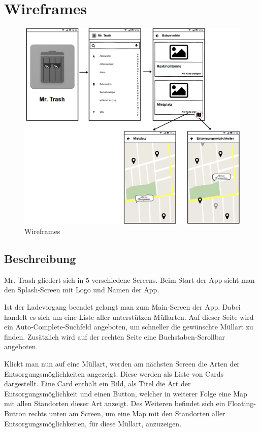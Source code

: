 \documentclass[12pt, a4paper]{scrreprt}
\begin{document}
\section{Wireframes}
\begin{figure}[h]
\centering
\includegraphics[width=13cm]{../graphical/mockup/wireframes.png}
\caption{\label{fig:art1} Wireframes}
\end{figure}

\subsection{Beschreibung}
Mr. Trash gliedert sich in 5 verschiedene Screens. Beim Start der App sieht man den Splash-Screen mit Logo und Namen der App.

Ist der Ladevorgang beendet gelangt man zum Main-Screen der App. Dabei handelt es sich um eine Liste aller unterstützen Müllarten. Auf dieser Seite wird ein Auto-Complete-Suchfeld angeboten, um schneller die gewünschte Müllart zu finden. Zusätzlich wird auf der rechten Seite eine Buchstaben-Scrollbar angeboten.

Klickt man nun auf eine Müllart, werden am nächsten Screen die Arten der Entsorgungsmöglichkeiten angezeigt. Diese werden als Liste von Cards dargestellt. Eine Card enthält ein Bild, als Titel die Art der Entsorgungsmöglichkeit und einen Button, welcher in weiterer Folge eine Map mit allen Standorten dieser Art anzeigt. Des Weiteren befindet sich ein Floating-Button rechts unten am Screen, um eine Map mit den Standorten aller Entsorgungsmöglichkeiten, für diese Müllart, anzuzeigen.
\end{document}
